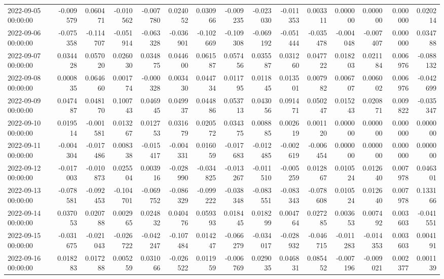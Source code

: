 \begin{tabular}{lrrrrrrrrrrrrrr}
2022-09-05 00:00:00 & -0.009579 & 0.060471 & -0.010562 & -0.007780 & 0.024052 & 0.030966 & -0.009235 & -0.023030 & -0.011353 & 0.003311 & 0.000000 & 0.000000 & 0.000000 & 0.020214 \\
2022-09-06 00:00:00 & -0.075358 & -0.114707 & -0.051914 & -0.063328 & -0.036901 & -0.102669 & -0.109308 & -0.069192 & -0.051444 & -0.035478 & -0.004048 & -0.007407 & 0.000000 & 0.034788 \\
2022-09-07 00:00:00 & 0.034428 & 0.057020 & 0.026030 & 0.034875 & 0.044600 & 0.061587 & 0.057456 & 0.035587 & 0.031260 & 0.047722 & 0.018203 & 0.021184 & 0.006976 & -0.088132 \\
2022-09-08 00:00:00 & 0.000835 & 0.064660 & 0.001774 & -0.000328 & 0.003430 & 0.044734 & 0.011795 & 0.011845 & 0.013501 & 0.007982 & 0.006707 & 0.006002 & 0.006976 & -0.042699 \\
2022-09-09 00:00:00 & 0.047487 & 0.048170 & 0.100743 & 0.046945 & 0.049937 & 0.044886 & 0.053713 & 0.043056 & 0.091471 & 0.050247 & 0.015243 & 0.020871 & 0.009822 & -0.035347 \\
2022-09-10 00:00:00 & 0.019514 & -0.001581 & 0.013267 & 0.012753 & 0.031679 & 0.020572 & 0.034375 & 0.008885 & 0.002619 & 0.001120 & 0.000000 & 0.000000 & 0.000000 & 0.000000 \\
2022-09-11 00:00:00 & -0.004304 & -0.017486 & 0.008338 & -0.015417 & -0.004331 & 0.016059 & -0.017683 & -0.012485 & -0.002619 & -0.006454 & 0.000000 & 0.000000 & 0.000000 & 0.000000 \\
2022-09-12 00:00:00 & -0.017003 & -0.010873 & 0.025504 & 0.003916 & -0.028990 & -0.034825 & -0.013267 & -0.011510 & -0.005259 & 0.012867 & 0.010524 & 0.012640 & 0.007978 & 0.046301 \\
2022-09-13 00:00:00 & -0.078581 & -0.092453 & -0.104701 & -0.069752 & -0.086329 & -0.099222 & -0.038348 & -0.083551 & -0.083343 & -0.078608 & 0.010524 & 0.012640 & 0.007978 & 0.133166 \\
2022-09-14 00:00:00 & 0.037053 & 0.020788 & 0.002965 & 0.024832 & 0.040476 & 0.059393 & 0.018445 & 0.018299 & 0.004764 & 0.027285 & 0.003653 & 0.007492 & 0.003603 & -0.041551 \\
2022-09-15 00:00:00 & -0.031675 & -0.021043 & -0.026722 & -0.042247 & -0.107484 & 0.014247 & -0.066279 & -0.034017 & -0.028932 & -0.046715 & -0.011283 & -0.014353 & 0.003603 & 0.004191 \\
2022-09-16 00:00:00 & 0.018283 & 0.017288 & 0.005259 & 0.031066 & -0.026522 & 0.011959 & -0.006769 & 0.029035 & 0.046831 & 0.085452 & -0.007196 & -0.009021 & 0.002377 & 0.001139 \\

\end{tabular}
